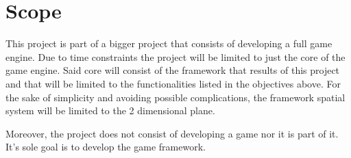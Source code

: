 \chapter{Scope}\label{ch:scope}

This project is part of a bigger project that consists of developing a full game engine. 
Due to time constraints the project will be limited to just the core of the game engine. 
Said core will consist of the framework that results of this project and that will 
be limited to the functionalities listed in the objectives above. For the sake of 
simplicity and avoiding possible complications, the framework spatial system will 
be limited to the 2 dimensional plane.

Moreover, the project does not consist of developing a game nor it is part of it. 
It's sole goal is to develop the game framework.
